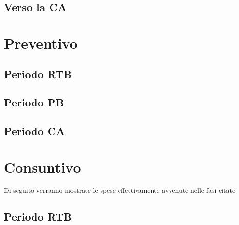 \documentclass[5pt]{article}
\begin{document}
\subsection{Verso la CA}

\section{Preventivo}
\subsection{Periodo RTB}
\subsection{Periodo PB}
\subsection{Periodo CA}

\section{Consuntivo}
Di seguito verranno mostrate le spese effettivamente avvenute nelle fasi citate
\subsection{Periodo RTB}
\end{document}
